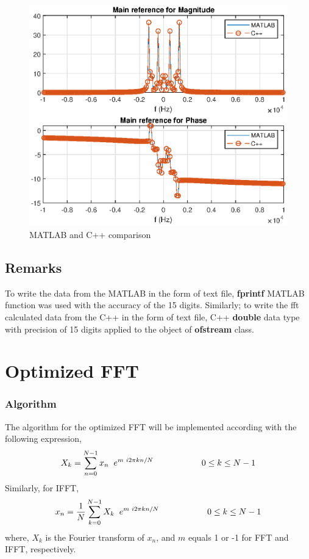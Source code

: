 \begin{refsection}
\begin{figure}[h]
	\centering
	\includegraphics[width=12cm]{./algorithms/fft/figures/mixed_signal_fft.eps}
	\caption{MATLAB and C++ comparison}\label{mixed_signal_fft}
\end{figure}
\subsection*{Remarks}
To write the data from the MATLAB in the form of text file, \textbf{fprintf} MATLAB function was used with the accuracy of the 15 digits. Similarly; to write the fft calculated data from the C++ in the form of text file, C++ \textbf{double} data type with precision of 15 digits applied to the object of \textbf{ofstream} class.\
\section*{Optimized FFT}
\subsubsection{Algorithm}
The algorithm for the optimized FFT will be implemented according with the following expression,
\begin{equation}
X_k =\sum\limits_{n=0}^{N-1} x_n \hspace{2mm} e^{m\hspace{1mm}i2\pi kn/N}		\hspace{2cm}	0\leq k \leq N-1
\label{optimized_FFT}
\end{equation}
Similarly, for IFFT,
\begin{equation}
x_n =\frac{1}{N} \sum\limits_{k=0}^{N-1} X_k \hspace{2mm}  e^{m\hspace{1mm}i2\pi kn/N}		\hspace{2cm}	0\leq k \leq N-1
\label{optimized_IFFT}
\end{equation}
where, $X_k$ is the Fourier transform of $x_n$, and $m$ equals 1 or -1 for FFT and IFFT, respectively.


\end{refsection}
